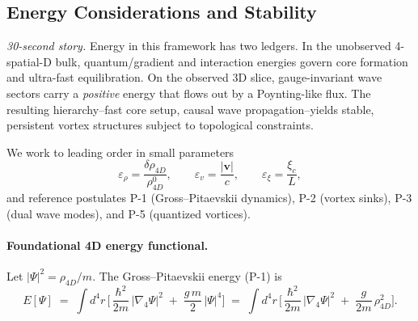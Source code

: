\medskip
\noindent
{}
\medskip

\subsection{Energy Considerations and Stability}

\textit{30-second story.} Energy in this framework has two ledgers. In the unobserved 4-spatial-D bulk, quantum/gradient and interaction energies govern core formation and ultra-fast equilibration. On the observed 3D slice, gauge-invariant wave sectors carry a \emph{positive} energy that flows out by a Poynting-like flux. The resulting hierarchy--fast core setup, causal wave propagation--yields stable, persistent vortex structures subject to topological constraints.

We work to leading order in small parameters
\[
\varepsilon_\rho=\frac{\delta\rho_{4D}}{\rho_{4D}^0},\qquad
\varepsilon_v=\frac{|\mathbf v|}{c},\qquad
\varepsilon_\xi=\frac{\xi_c}{L},
\]
and reference postulates P-1 (Gross–Pitaevskii dynamics), P-2 (vortex sinks), P-3 (dual wave modes), and P-5 (quantized vortices).

\medskip
\noindent
{}
\medskip

\paragraph{Foundational 4D energy functional.}
Let $|\Psi|^2=\rho_{4D}/m$. The Gross–Pitaevskii energy (P-1) is
\begin{equation}
E[\Psi] \;=\; \int d^4 r\,\Big[\,\frac{\hbar^2}{2m}\,|\nabla_4\Psi|^2 \;+\; \frac{g\,m}{2}\,|\Psi|^4 \Big]
\;=\; \int d^4 r\,\Big[\,\frac{\hbar^2}{2m}\,|\nabla_4\Psi|^2 \;+\; \frac{g}{2m}\,\rho_{4D}^2 \Big].
\label{eq:E-GP}
\end{equation}
